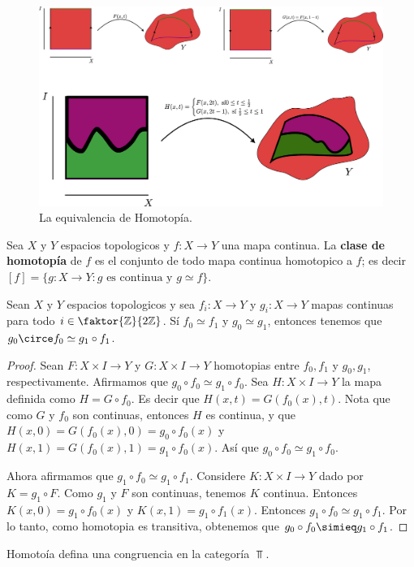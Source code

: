 \begin{figure}[h]
    \centering
    \includegraphics[scale=0.2]{Figures/homotopia_2.eps}
    \caption{La equivalencia de Homotop\'ia.}
    \label{fig_14}
\end{figure}

\begin{definition}
    Sea $X$ y  $Y$ espacios topologicos y  $f:X \xrightarrow{} Y$ una mapa
    continua. La \textbf{clase de homotop\'ia} de $f$ es el conjunto de todo
    mapa continua homotopico a $f$; es decir  $[f]=\{g:X \xrightarrow{} Y : g
    \text{ es continua y } g \simeq f\}$.
\end{definition}

\begin{theorem}\label{thm_5.10}
    Sean $X$ y  $Y$ espacios topologicos y sea  $f_i:X \xrightarrow{} Y$ y
    $g_i:X \xrightarrow{} Y$ mapas continuas para todo $i \in \faktor{\Z}{2\Z}$.
    S\'i $f_0 \simeq f_1$ y $g_0 \simeq g_1$, entonces tenemos que $g_0 \circe
    f_0 \simeq g_1 \circ f_1$.
\end{theorem}
\begin{proof}
    Sean $F:X \times I \xrightarrow{} Y$  y $G:X \times I \xrightarrow{} Y$
    homotopias entre $f_0,f_1$ y $g_0,g_1$, respectivamente. Afirmamos que $g_0
    \circ f_0 \simeq g_1 \circ f_0$. Sea $H:X \times I \xrightarrow{} Y$ la mapa
    definida como $H=G \circ f_0$. Es decir que $H(x,t)=G(f_0(x),t)$. Nota que
    como $G$ y  $f_0$ son continuas, entonces $H$ es continua, y que
    $H(x,0)=G(f_0(x),0)=g_0 \circ f_0(x)$ y $H(x,1)=G(f_0(x),1)=g_1 \circ
    f_0(x)$. As\'i que $g_0 \circ f_0 \simeq g_1 \circ f_0$.

    Ahora afirmamos que $g_1 \circ f_0 \simeq g_1 \circ f_1$. Considere $K:X
    \times I \xrightarrow{} Y$ dado por $K=g_1 \circ F$. Como $g_1$ y $F$ son
    continuas, tenemos $K$ continua. Entonces  $K(x,0)=g_1 \circ f_0(x)$ y
    $K(x,1)=g_1 \circ f_1(x)$. Entonces $g_1 \circ f_0 \simeq g_1 \circ f_1$.
    Por lo tanto, como homotopia es transitiva, obtenemos que $g_0 \circ f_0
    \simieq g_1 \circ f_1$.
\end{proof}
\begin{corollary}
    Homoto\'ia defina una congruencia en la categor\'ia $\Top$.
\end{corollary}

